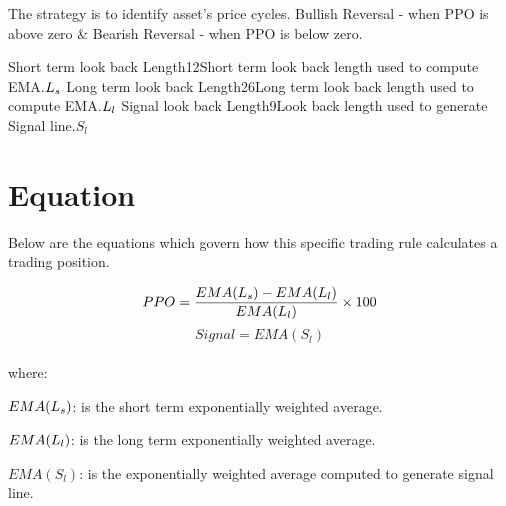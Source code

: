\documentclass{article}
\begin{document}
\logo
{} %
\tblofcontents


\howtotrade
{The strategy is to identify asset's price cycles.
Bullish Reversal - when PPO is above zero \&
Bearish Reversal - when PPO is below zero.
}

{Short term look back Length}{12}{Short term look back length used to compute EMA.}{$L_{s}$}
{Long term look back Length}{26}{Long term look back length used to compute EMA.}{$L_{l}$}
{Signal look back Length}{9}{Look back length used to generate Signal line.}{$S_{l}$}
\stoptable %

\newpage
\section{Equation}
Below are the equations which govern how this specific trading rule calculates a trading position.

\begin{equation}
    PPO = \frac{EMA(L_{s}) -         EMA(L_{l})}{EMA(L_{l})} \times 100
\end{equation}
\begin{equation}
    Signal = EMA(S_{l})
\end{equation}
\\ %
where:

$EMA(L_{s})$: is the short term exponentially weighted average.

$EMA(L_{l})$: is the long term exponentially weighted average.

$EMA(S_{l})$: is the exponentially weighted average computed to generate signal line.

\keyterms
\furtherlinks %
\end{document}
